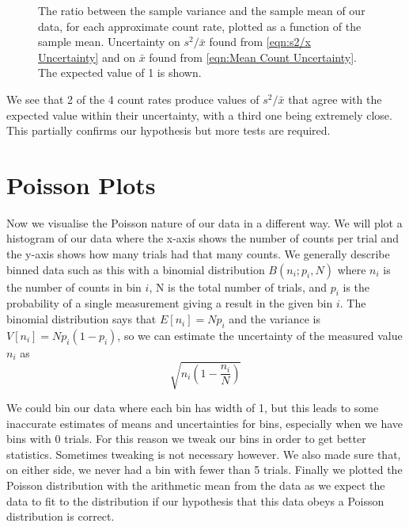 \documentclass[12pt]{article}
\numberwithin{equation}{section}
\numberwithin{figure}{section}
\numberwithin{table}{section}
\begin{document}
\begin{figure}[H]
    \begin{center}
       \caption{The ratio between the sample variance and the sample mean of our data, for each approximate count rate, plotted as a function of the sample mean. Uncertainty on $s^2/\bar{x}$ found from \autoref{eqn:s2/x Uncertainty} and on $\bar{x}$ found from \autoref{eqn:Mean Count Uncertainty}. The expected value of 1 is shown. }
       \label{fig:s2_x}
    \end{center}
\end{figure}
\par We see that 2 of the 4 count rates produce values of $s^2/\bar{x}$ that agree with the expected value within their uncertainty, with a third one being extremely close. This partially confirms our hypothesis but more tests are required. 

\section{Poisson Plots}\label{sec:Poisson Plots}
\par Now we visualise the Poisson nature of our data in a different way. We will plot a histogram of our data where the x-axis shows the number of counts per trial and the y-axis shows how many trials had that many counts. We generally describe binned data such as this with a binomial distribution $B(n_i;p_i, N)$ where $n_i$ is the number of counts in bin $i$, N is the total number of trials, and $p_i$ is the probability of a single measurement giving a result in the given bin $i$. The binomial distribution says that $E[n_i]=Np_i$ and the variance is $V[n_i]=Np_i(1-p_i)$, so we can estimate the uncertainty of the measured value $n_i$ as 
\begin{equation}
    \sqrt{n_i\left(1-\frac{n_i}{N}\right)}
    \label{eqn:Bin Count Uncertainty}
\end{equation}
\par We could bin our data where each bin has width of 1, but this leads to some inaccurate estimates of means and uncertainties for bins, especially when we have bins with 0 trials. For this reason we tweak our bins in order to get better statistics. Sometimes tweaking is not necessary however. We also made sure that, on either side, we never had a bin with fewer than 5 trials. Finally we plotted the Poisson distribution with the arithmetic mean from the data as we expect the data to fit to the distribution if our hypothesis that this data obeys a Poisson distribution is correct. 
\end{document}
